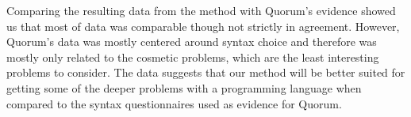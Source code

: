 Comparing the resulting data from the method with Quorum’s evidence showed us that most of data was comparable though not strictly in agreement.
However, Quorum’s data was mostly centered around syntax choice and therefore was mostly only related to the cosmetic problems, which are the least interesting problems to consider.
The data suggests that our method will be better suited for getting some of the deeper problems with a programming language when compared to the syntax questionnaires used as evidence for Quorum.


